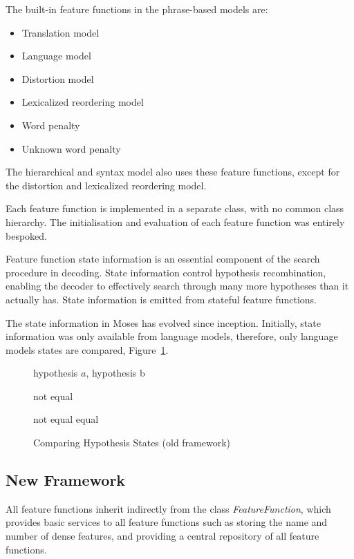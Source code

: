 \documentclass{pbml}
\begin{document}
The built-in feature functions in the phrase-based models are:
\begin{itemize}
  \item Translation model
  \item Language model
  \item Distortion model
  \item Lexicalized reordering model
  \item Word penalty
  \item Unknown word penalty
\end{itemize}

The hierarchical and syntax model also uses these feature functions, except for the distortion and lexicalized reordering model.

Each feature function is implemented in a separate class, with no common class hierarchy. The initialisation and evaluation of each feature function was entirely bespoked.

Feature function state information is an essential component of the search procedure in decoding. State information control hypothesis recombination, enabling the decoder to effectively search through many more hypotheses than it actually has. State information is emitted from stateful feature functions.

The state information in Moses has evolved since inception. Initially, state information was only available from language models, therefore, only language models states are compared, Figure~\ref{algo:CompareHypoStates}.

\begin{figure} [h!]
\small 
\begin{algorithmic}
\REQUIRE hypothesis $a$, hypothesis b

	\RETURN not equal
       \ENDIF
       
	    \RETURN not equal
	 \ENDIF
        \ENDFOR
        \RETURN equal

\end{algorithmic}
\caption{Comparing Hypothesis States (old framework)}
\label{algo:CompareHypoStates}
\end{figure} 

\subsection{New Framework}        
 All feature functions inherit indirectly from the class \emph{FeatureFunction}, which provides basic services to all feature functions such as storing the name and number of dense features, and providing a central repository of all feature functions.
\end{document}
